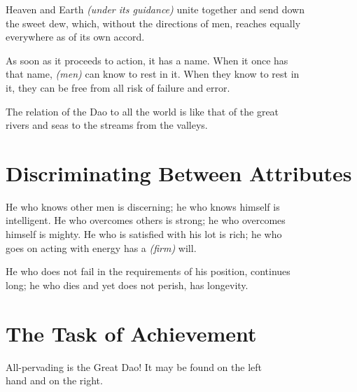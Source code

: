     Heaven and Earth \textit{(under its guidance)} unite together and send down\\
    the sweet dew, which, without the directions of men, reaches equally\\
    everywhere as of its own accord.\vspace{\baselineskip}
    
    As soon as it proceeds to action, it has a name. When it once has\\
    that name, \textit{(men)} can know to rest in it. When they know to rest in\\
    it, they can be free from all risk of failure and error.\vspace{\baselineskip}
    
    The relation of the Dao to all the world is like that of the great\\
    rivers and seas to the streams from the valleys.\vspace{\baselineskip}
    
\section*{Discriminating Between Attributes}
    He who knows other men is discerning; he who knows himself is\\
    intelligent. He who overcomes others is strong; he who overcomes\\
    himself is mighty. He who is satisfied with his lot is rich; he who\\
    goes on acting with energy has a \textit{(firm)} will.\vspace{\baselineskip}
    
    He who does not fail in the requirements of his position, continues\\
    long; he who dies and yet does not perish, has longevity.\vspace{\baselineskip}

\section*{The Task of Achievement}
    All-pervading is the Great Dao! It may be found on the left\\
    hand and on the right.\vspace{\baselineskip}
    
